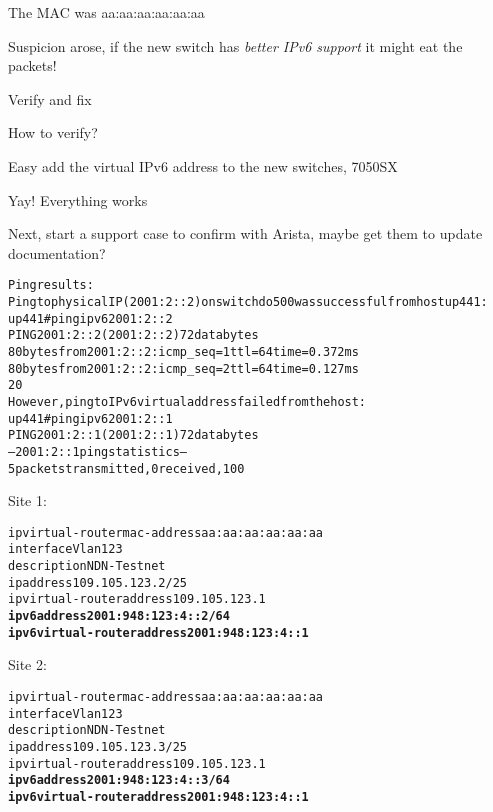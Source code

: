 \documentclass[18pt,landscape,a4paper,footrule]{foils}
\begin{document}
The MAC was aa:aa:aa:aa:aa:aa \smiley

Suspicion arose, if the new switch has \emph{better IPv6 support} it might eat the packets!

Verify and fix
\begin{list2}
\item How to verify?
\item Easy add the virtual IPv6 address to the new switches, 7050SX
\item Yay! Everything works
\item Next, start a support case to confirm with Arista, maybe get them to update documentation?
\end{list2}






\begin{alltt}\footnotesize

Ping results:
Ping to physical IP (2001:2::2) on switch do500 was successful from host up441:
up441#ping ipv6 2001:2::2
PING 2001:2::2(2001:2::2) 72 data bytes
80 bytes from 2001:2::2: icmp_seq=1 ttl=64 time=0.372 ms
80 bytes from 2001:2::2: icmp_seq=2 ttl=64 time=0.127 ms
20
However, ping to IPv6 virtual address failed from the host:
up441#ping ipv6 2001:2::1
PING 2001:2::1(2001:2::1) 72 data bytes
--- 2001:2::1 ping statistics ---
5 packets transmitted, 0 received, 100% packet loss, time 4003ms

\end{alltt}




Site 1:
\begin{alltt}\small
ip virtual-router mac-address aa:aa:aa:aa:aa:aa
interface Vlan123
   description NDN-Testnet
   ip address 109.105.123.2/25
   ip virtual-router address 109.105.123.1\bf
      ipv6 address 2001:948:123:4::2/64
      ipv6 virtual-router address 2001:948:123:4::1
\end{alltt}

Site 2:
\begin{alltt}\small
ip virtual-router mac-address aa:aa:aa:aa:aa:aa
interface Vlan123
   description NDN-Testnet
   ip address 109.105.123.3/25
   ip virtual-router address 109.105.123.1\bf
      ipv6 address 2001:948:123:4::3/64
      ipv6 virtual-router address 2001:948:123:4::1
\end{alltt}
\end{document}
